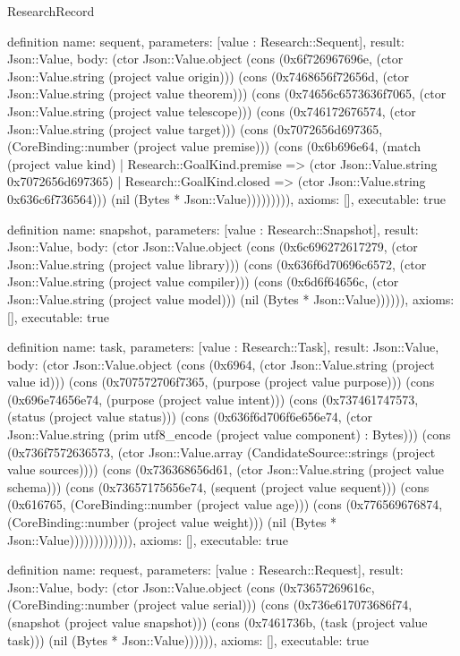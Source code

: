 \begin{lexlean}{ResearchRecord}
\begin{semanticmodule}
definition{
 name: sequent,
 parameters: [value : Research::Sequent],
 result: Json::Value,
 body: (ctor Json::Value.object (cons (0x6f726967696e, (ctor Json::Value.string (project value origin))) (cons (0x7468656f72656d, (ctor Json::Value.string (project value theorem))) (cons (0x74656c6573636f7065, (ctor Json::Value.string (project value telescope))) (cons (0x746172676574, (ctor Json::Value.string (project value target))) (cons (0x7072656d697365, (CoreBinding::number (project value premise))) (cons (0x6b696e64, (match (project value kind) | Research::GoalKind.premise => (ctor Json::Value.string 0x7072656d697365) | Research::GoalKind.closed => (ctor Json::Value.string 0x636c6f736564))) (nil (Bytes * Json::Value))))))))),
 axioms: [],
 executable: true
}

definition{
 name: snapshot,
 parameters: [value : Research::Snapshot],
 result: Json::Value,
 body: (ctor Json::Value.object (cons (0x6c696272617279, (ctor Json::Value.string (project value library))) (cons (0x636f6d70696c6572, (ctor Json::Value.string (project value compiler))) (cons (0x6d6f64656c, (ctor Json::Value.string (project value model))) (nil (Bytes * Json::Value)))))),
 axioms: [],
 executable: true
}

definition{
 name: task,
 parameters: [value : Research::Task],
 result: Json::Value,
 body: (ctor Json::Value.object (cons (0x6964, (ctor Json::Value.string (project value id))) (cons (0x707572706f7365, (purpose (project value purpose))) (cons (0x696e74656e74, (purpose (project value intent))) (cons (0x737461747573, (status (project value status))) (cons (0x636f6d706f6e656e74, (ctor Json::Value.string (prim utf8_encode (project value component) : Bytes))) (cons (0x736f7572636573, (ctor Json::Value.array (CandidateSource::strings (project value sources)))) (cons (0x736368656d61, (ctor Json::Value.string (project value schema))) (cons (0x73657175656e74, (sequent (project value sequent))) (cons (0x616765, (CoreBinding::number (project value age))) (cons (0x776569676874, (CoreBinding::number (project value weight))) (nil (Bytes * Json::Value))))))))))))),
 axioms: [],
 executable: true
}

definition{
 name: request,
 parameters: [value : Research::Request],
 result: Json::Value,
 body: (ctor Json::Value.object (cons (0x73657269616c, (CoreBinding::number (project value serial))) (cons (0x736e617073686f74, (snapshot (project value snapshot))) (cons (0x7461736b, (task (project value task))) (nil (Bytes * Json::Value)))))),
 axioms: [],
 executable: true
}


\end{semanticmodule}
\end{lexlean}
